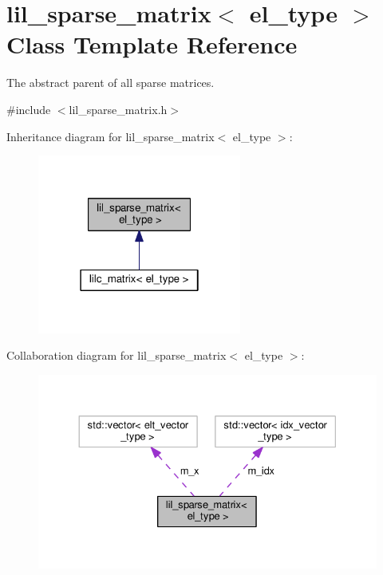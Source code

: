 \hypertarget{classlil__sparse__matrix}{}\section{lil\+\_\+sparse\+\_\+matrix$<$ el\+\_\+type $>$ Class Template Reference}
\label{classlil__sparse__matrix}


The abstract parent of all sparse matrices.  




{\ttfamily \#include $<$lil\+\_\+sparse\+\_\+matrix.\+h$>$}



Inheritance diagram for lil\+\_\+sparse\+\_\+matrix$<$ el\+\_\+type $>$\+:
\nopagebreak
\begin{figure}[H]
\begin{center}
\leavevmode
\includegraphics[width=190pt]{classlil__sparse__matrix__inherit__graph}
\end{center}
\end{figure}


Collaboration diagram for lil\+\_\+sparse\+\_\+matrix$<$ el\+\_\+type $>$\+:
\nopagebreak
\begin{figure}[H]
\begin{center}
\leavevmode
\includegraphics[width=330pt]{classlil__sparse__matrix__coll__graph}
\end{center}
\end{figure}
